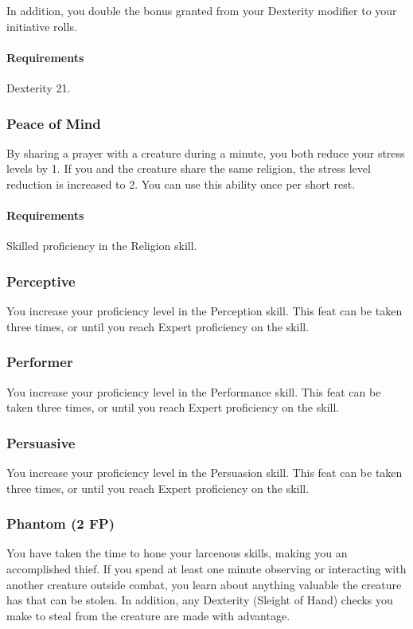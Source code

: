     In addition, you double the bonus granted from your Dexterity modifier to your initiative rolls.
    \paragraph{Requirements} Dexterity 21.
\subsubsection{Peace of Mind} \label{feat::peaceofmind}
    By sharing a prayer with a creature during a minute, you both reduce your stress levels by 1.
    If you and the creature share the same religion, the stress level reduction is increased to 2.
    You can use this ability once per short rest.
    \paragraph{Requirements} Skilled proficiency in the Religion skill.
\subsubsection{Perceptive} \label{feat::perceptive}
    You increase your proficiency level in the Perception skill.
    This feat can be taken three times, or until you reach Expert proficiency on the skill.
\subsubsection{Performer} \label{feat::performer}
    You increase your proficiency level in the Performance skill.
    This feat can be taken three times, or until you reach Expert proficiency on the skill.
\subsubsection{Persuasive} \label{feat::persuasive}
    You increase your proficiency level in the Persuasion skill.
    This feat can be taken three times, or until you reach Expert proficiency on the skill.
\subsubsection{Phantom (2 FP)} \label{feat::phantom} %
    You have taken the time to hone your larcenous skills, making you an accomplished thief.
    If you spend at least one minute observing or interacting with another creature outside combat, you learn about anything valuable the creature has that can be stolen.
    In addition, any Dexterity (Sleight of Hand) checks you make to steal from the creature are made with advantage.
